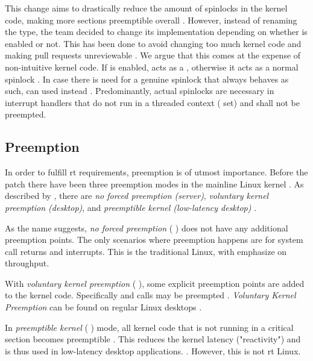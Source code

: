 \documentclass[10pt,twocolumn,a4paper]{article}
\begin{document}
\noindent This change aims to drastically reduce the amount of spinlocks in the kernel code, making more sections preemptible overall \cite{lf:sleeping-spinlocks}.
However, instead of renaming the type, the team decided to change its implementation depending on whether  is enabled or not.
This has been done to avoid changing too much kernel code and making pull requests unreviewable \cite{reghenzani_realtime_2019}.
We argue that this comes at the expense of non-intuitive kernel code.
If  is enabled,  acts as a , otherwise it acts as a normal spinlock \cite{mckenney_realtime_2005}.
In case there is need for a genuine spinlock that always behaves as such,  can used instead \cite{mckenney_realtime_2005, chyyuu_github_2017}.
Predominantly, actual spinlocks are necessary in interrupt handlers that do not run in a threaded context ( set) and shall not be preempted.


\subsection{Preemption}\label{subsec:preemption}
In order to fulfill \acrshort{rt} requirements, preemption is of utmost importance.
Before the  patch there have been three preemption modes in the mainline Linux kernel \cite{lf:preemption}.
As described by \citeauthor{lf:preemption}, there are \emph{no forced preemption (server)}, \emph{voluntary kernel preemption (desktop)}, and \emph{preemptible kernel (low-latency desktop)} \cite{lf:preemption}.

As the name suggests, \emph{no forced preemption} ( \cite{mckenney_realtime_2005}) does not have any additional preemption points.
The only scenarios where preemption happens are for system call returns and interrupts.
This is the traditional Linux, with emphasize on throughput.

With \emph{voluntary kernel preemption} ( \cite{mckenney_realtime_2005}), some explicit preemption points are added to the kernel code.
Specifically  and  calls may be preempted \cite{day_re_2007}.
\emph{Voluntary Kernel Preemption} can be found on regular Linux desktops \cite{mckenney_realtime_2005}.

In \emph{preemptible kernel} ( \cite{mckenney_realtime_2005}) mode, all kernel code that is not running in a critical section becomes preemptible \cite{lf:preemption}.
This reduces the kernel latency ("reactivity") and is thus used in low-latency desktop applications. \cite{mckenney_realtime_2005}.
However, this is not \acrshort{rt} Linux.
\newline
\end{document}
